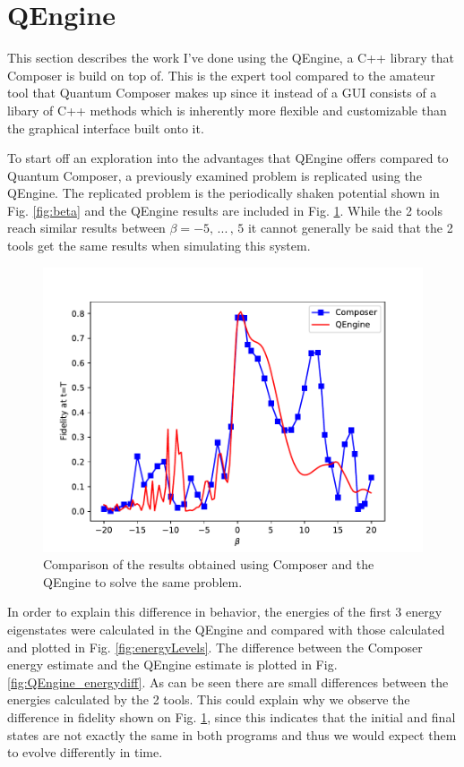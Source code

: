 \documentclass[a4paper, twocolumn]{revtex4-1}
\begin{document}
\section{\label{sec:QEngine} QEngine}
This section describes the work I've done using the QEngine, a C++ library that Composer is build on top of. This is the expert tool compared to the amateur tool that Quantum Composer makes up since it instead of a GUI consists of a libary of C++ methods which is inherently more flexible and customizable than the graphical interface built onto it.

To start off an exploration into the advantages that QEngine offers compared to Quantum Composer, a previously examined problem is replicated using the QEngine. The replicated problem is the periodically shaken potential shown in Fig. \ref{fig:beta} and the QEngine results are included in Fig. \ref{fig:QEngine_nonOPt}. While the 2 tools reach similar results between $\beta = -5, \, ...\, , \, 5$ it cannot generally be said that the 2 tools get the same results when simulating this system.
\begin{figure}
	\includegraphics[width=\columnwidth]{graphics/qengine/comparison.pdf}
	\caption{Comparison of the results obtained using Composer and the QEngine to solve the same problem.}
	\label{fig:QEngine_nonOPt}
\end{figure}

In order to explain this difference in behavior, the energies of the first 3 energy eigenstates were calculated in the QEngine and compared with those calculated and plotted in Fig. \ref{fig:energyLevels}. The difference between the Composer energy estimate and the QEngine estimate is plotted in Fig. \ref{fig:QEngine_energydiff}. As can be seen there are small differences between the energies calculated by the 2 tools. This could explain why we observe the difference in fidelity shown on Fig. \ref{fig:QEngine_nonOPt}, since this indicates that the initial and final states are not exactly the same in both programs and thus we would expect them to evolve differently in time.
\end{document}
